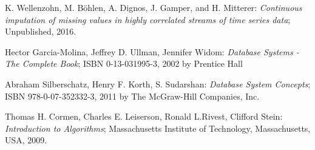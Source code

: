 \documentclass[abstracton,12pt]{scrreprt}
\begin{document}
\begin{thebibliography}{99}
	
	
	 K. Wellenzohn, M. Böhlen, A. Dignos, J. Gamper, and H. Mitterer: \emph{Continuous imputation of missing values in highly correlated streams of time series data}; Unpublished, 2016.
	
	 Hector Garcia-Molina, Jeffrey D. Ullman, Jennifer Widom: \emph{Database Systems - The Complete Book}; ISBN 0-13-031995-3, 2002 by Prentice Hall
		
	 Abraham Silberschatz, Henry F. Korth, S. Sudarshan: \emph{Database System Concepts}; ISBN 978-0-07-352332-3, 2011 by The McGraw-Hill Companies, Inc.

	 Thomas H. Cormen, Charles E. Leiserson, Ronald L.Rivest, Clifford Stein: \emph{Introduction to Algorithms}; Massachusetts Institute of Technology, Massachusetts, USA, 2009. 


\end{thebibliography}
\end{document}
